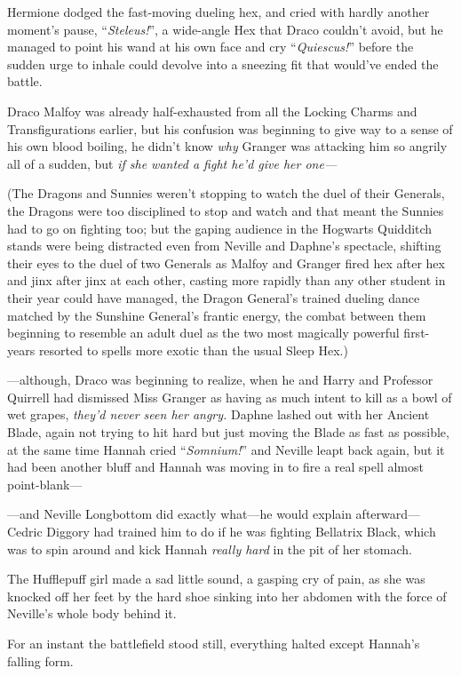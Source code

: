 Hermione dodged the fast-moving dueling hex, and cried with
hardly another moment’s pause, “\emph{Steleus!}”, a wide-angle Hex
that Draco couldn’t avoid, but he managed to point his wand at his
own face and cry “\emph{Quiescus!}” before the sudden urge to
inhale could devolve into a sneezing fit that would’ve ended the
battle.

Draco Malfoy was already half-exhausted from all the Locking
Charms and Transfigurations earlier, but his confusion was
beginning to give way to a sense of his own blood boiling, he
didn’t know \emph{why} Granger was attacking him so angrily all of
a sudden, but \emph{if she wanted a fight he’d give her one—}

(The Dragons and Sunnies weren’t stopping to watch the duel of
their Generals, the Dragons were too disciplined to stop and watch
and that meant the Sunnies had to go on fighting too; but the
gaping audience in the Hogwarts Quidditch stands were being
distracted even from Neville and Daphne’s spectacle, shifting their
eyes to the duel of two Generals as Malfoy and Granger fired hex
after hex and jinx after jinx at each other, casting more rapidly
than any other student in their year could have managed, the Dragon
General’s trained dueling dance matched by the Sunshine General’s
frantic energy, the combat between them beginning to resemble an
adult duel as the two most magically powerful first-years resorted
to spells more exotic than the usual Sleep Hex.)

—although, Draco was beginning to realize, when he and Harry
and Professor Quirrell had dismissed Miss Granger as having as much
intent to kill as a bowl of wet grapes, \emph{they’d never seen her
angry.}
\sbreak
Daphne lashed out with her Ancient Blade, again not trying to
hit hard but just moving the Blade as fast as possible, at the same
time Hannah cried “\emph{Somnium!}” and Neville leapt back again,
but it had been another bluff and Hannah was moving in to fire a
real spell almost point-blank—

—and Neville Longbottom did exactly what—he would explain
afterward—Cedric Diggory had trained him to do if he was fighting
Bellatrix Black, which was to spin around and kick Hannah \emph{really
hard} in the pit of her stomach.

The Hufflepuff girl made a sad little sound, a gasping cry of
pain, as she was knocked off her feet by the hard shoe sinking into
her abdomen with the force of Neville’s whole body behind it.

For an instant the battlefield stood still, everything halted
except Hannah’s falling form.


